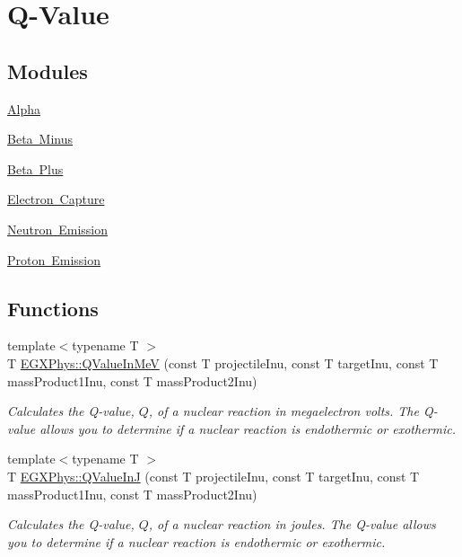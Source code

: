 \hypertarget{group___e_g_x_phys-_q_value}{}\section{Q-\/\+Value}
\label{group___e_g_x_phys-_q_value}
\subsection*{Modules}
\begin{DoxyCompactItemize}
\item 
\mbox{\hyperlink{group___e_g_x_phys-_q_value-_alpha}{Alpha}}
\item 
\mbox{\hyperlink{group___e_g_x_phys-_q_value-_beta_minus}{Beta Minus}}
\item 
\mbox{\hyperlink{group___e_g_x_phys-_q_value-_beta_plus}{Beta Plus}}
\item 
\mbox{\hyperlink{group___e_g_x_phys-_q_value-_electron_capture}{Electron Capture}}
\item 
\mbox{\hyperlink{group___e_g_x_phys-_q_value-_neutron_emission}{Neutron Emission}}
\item 
\mbox{\hyperlink{group___e_g_x_phys-_q_value-_proton_emission}{Proton Emission}}
\end{DoxyCompactItemize}
\subsection*{Functions}
\begin{DoxyCompactItemize}
\item 
{\footnotesize template$<$typename T $>$ }\\T \mbox{\hyperlink{group___e_g_x_phys-_q_value_ga53f07ac44d3d3b217b8c5b7aa548e3fc}{E\+G\+X\+Phys\+::\+Q\+Value\+In\+MeV}} (const T projectile\+Inu, const T target\+Inu, const T mass\+Product1\+Inu, const T mass\+Product2\+Inu)
\begin{DoxyCompactList}\small\item\em Calculates the Q-\/value, $Q$, of a nuclear reaction in megaelectron volts. The Q-\/value allows you to determine if a nuclear reaction is endothermic or exothermic. \end{DoxyCompactList}\item 
{\footnotesize template$<$typename T $>$ }\\T \mbox{\hyperlink{group___e_g_x_phys-_q_value_gaa61414574096631a36ff857b311c435c}{E\+G\+X\+Phys\+::\+Q\+Value\+InJ}} (const T projectile\+Inu, const T target\+Inu, const T mass\+Product1\+Inu, const T mass\+Product2\+Inu)
\begin{DoxyCompactList}\small\item\em Calculates the Q-\/value, $Q$, of a nuclear reaction in joules. The Q-\/value allows you to determine if a nuclear reaction is endothermic or exothermic. \end{DoxyCompactList}\end{DoxyCompactItemize}


